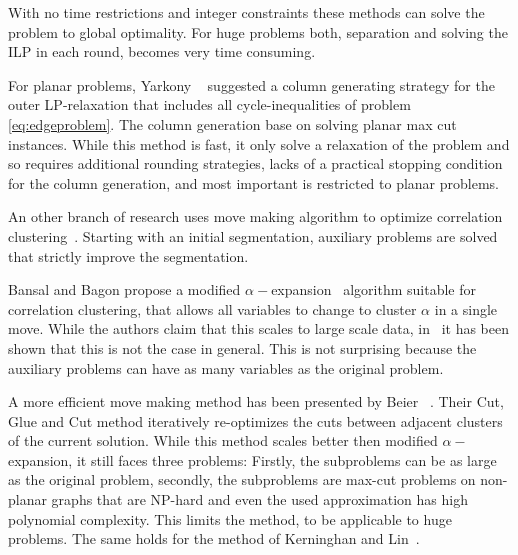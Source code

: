 \documentclass[10pt,twocolumn,letterpaper]{article}
\begin{document}
With no time restrictions and integer constraints these methods can solve the problem to global optimality.
For huge problems both, separation and solving the ILP in each round, becomes very time consuming.

For planar problems, Yarkony \etal~\cite{yarkony_2012_eccv} 
suggested a column generating strategy for the outer LP-relaxation
that includes all cycle-inequalities of problem \ref{eq:edgeproblem}.
The column generation base on solving planar max cut instances.
While this method is fast, 
it only solve a relaxation of the problem and so requires additional rounding strategies,
lacks of a practical stopping condition for the column generation,
and most important  is restricted to planar problems.

An other branch of research uses move making algorithm 
to optimize correlation clustering~\cite{bansal_2004_ml,beier_2014_cvpr,Kerninghan-1970}.
Starting with an initial segmentation, auxiliary problems are solved that 
strictly improve the segmentation.

Bansal and Bagon propose a modified $\alpha-$expansion~\cite{bansal_2004_ml} 
algorithm suitable for correlation clustering, that allows all variables to 
change to cluster $\alpha$ in a single move. While the authors claim that this
scales to large scale data, in~\cite{beier_2014_cvpr} it has been shown that 
this is not the case in general. This is not surprising because the auxiliary 
problems can have as many variables as the original problem. 
 
A more efficient move making method has been presented by Beier \etal~\cite{beier_2014_cvpr}.
Their Cut, Glue and Cut method iteratively re-optimizes the cuts between adjacent clusters of the current solution.
While this method scales better then  modified $\alpha-$expansion, it still faces three problems:
Firstly, the subproblems can be as large as the original problem,
secondly, the subproblems are max-cut problems on non-planar graphs that are NP-hard 
and even the used approximation has high polynomial complexity.
This limits the method, to be applicable to huge problems. The same holds for the 
method of Kerninghan and Lin~\cite{Kerninghan-1970}. 

\end{document}
